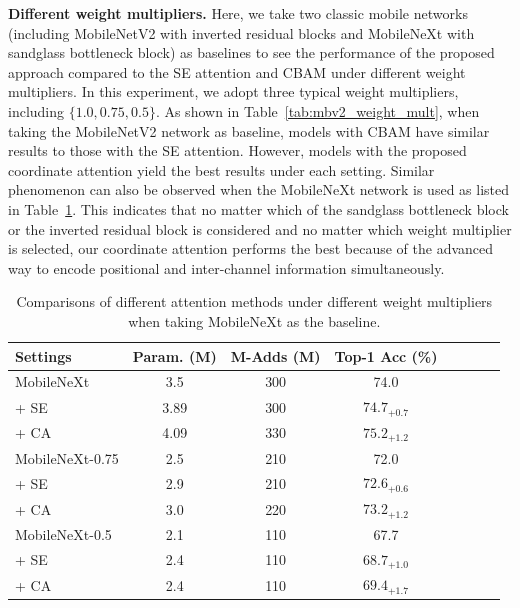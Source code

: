 \documentclass[final]{cvpr}
\newcommand{\myPara}[1]{\vspace{.05in}\noindent\textbf{#1.}}
\begin{document}
\myPara{Different weight multipliers}
%
Here, we take two classic mobile networks (including
MobileNetV2 \cite{sandler2018mobilenetv2} with inverted
residual blocks and
MobileNeXt \cite{daquan2020rethinking} with sandglass bottleneck block) as baselines
to see the performance of the proposed approach
compared to the SE attention \cite{hu2018squeeze} and
CBAM \cite{woo2018cbam} under different weight
multipliers.
%
In this experiment, we adopt three typical
weight multipliers, including $\{1.0, 0.75, 0.5\}$.
%
As shown in Table~\ref{tab:mbv2_weight_mult},
when taking the MobileNetV2 network as baseline,
models with CBAM have similar results to those 
with the SE attention.
%
However, models with the proposed coordinate attention
yield the best results under each setting.
%
Similar phenomenon can also be observed when the
MobileNeXt network is used as listed
in Table~\ref{tab:mnext_weight_mult}.
%
This indicates that no matter which of the sandglass
bottleneck block or the inverted residual block 
is considered and no matter which weight multiplier
is selected, our coordinate attention performs
the best because of the advanced way to encode positional
and inter-channel information simultaneously.

\begin{table}[t]
    \centering
    \small
    \setlength\tabcolsep{1mm}
    \renewcommand{\arraystretch}{1.1}
    \caption{Comparisons of different attention methods under different weight multipliers when taking MobileNeXt \cite{daquan2020rethinking} as the baseline.}
    \begin{tabular}{lccccccc} \midrule[1pt]
    Settings & Param. (M) & M-Adds (M) & Top-1 Acc (\%)  \\ \midrule[1pt]
    MobileNeXt  &   3.5      &  300    &  74.0     \\
    + SE &   3.89      &  300    &  $74.7_{+0.7}$     \\
    + CA &   4.09 &   330 & $\mathbf{75.2_{+1.2}}$ \\ \midrule[1pt]
    MobileNeXt-0.75  &   2.5      &  210    &  72.0     \\
    + SE &   2.9      &  210    &  $72.6_{+0.6}$     \\
    + CA &   3.0 &   220 & $\mathbf{73.2_{+1.2}}$ \\ \midrule[1pt]
    MobileNeXt-0.5  &   2.1      &  110    &  67.7     \\
    + SE &   2.4      &  110    &  $68.7_{+1.0}$     \\
    + CA &   2.4 &   110 & $\mathbf{69.4_{+1.7}}$ \\ \bottomrule[1pt]
    \end{tabular}
    
    \label{tab:mnext_weight_mult}
\end{table}
\end{document}
